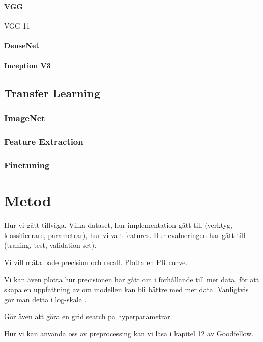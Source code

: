 \documentclass{kththesis}
\begin{document}
      \subsubsection{VGG}
      VGG-11

      \subsubsection{DenseNet}

      \subsubsection{Inception V3}

  \section{Transfer Learning}

    \subsection{ImageNet}

    \subsection{Feature Extraction}

    \subsection{Finetuning}



\chapter{Metod}
Hur vi gått tillväga. Vilka dataset, hur implementation gått till (verktyg, klassificerare, parametrar), hur vi valt features.
Hur evalueringen har gått till (traning, test, validation set).

Vi vill mäta både precision och recall. Plotta en PR curve.

Vi kan även plotta hur precisionen har gått om i förhållande till mer data, för att skapa en uppfattning av om modellen kan bli bättre med mer data. Vanligtvis gör man detta i log-skala \parencite{Goodfellow-et-al-2016}. 

Gör även att göra en grid search på hyperparametrar.

Hur vi kan använda oss av preprocessing kan vi  läsa i kapitel 12 av Goodfellow.
\end{document}
